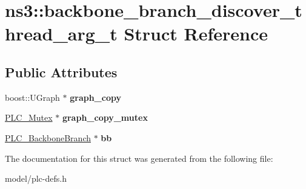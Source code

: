 \hypertarget{structns3_1_1backbone__branch__discover__thread__arg__t}{\section{ns3\-:\-:backbone\-\_\-branch\-\_\-discover\-\_\-thread\-\_\-arg\-\_\-t \-Struct \-Reference}
\label{structns3_1_1backbone__branch__discover__thread__arg__t}
}
\subsection*{\-Public \-Attributes}
\begin{DoxyCompactItemize}
\item 
\hypertarget{structns3_1_1backbone__branch__discover__thread__arg__t_ab4317ea3e51c1e7036318b20b28b3e81}{boost\-::\-U\-Graph $\ast$ {\bfseries graph\-\_\-copy}}\label{structns3_1_1backbone__branch__discover__thread__arg__t_ab4317ea3e51c1e7036318b20b28b3e81}

\item 
\hypertarget{structns3_1_1backbone__branch__discover__thread__arg__t_aebda45110313b30a94deffe5b3654e5a}{\hyperlink{structns3_1_1PLC__Mutex}{\-P\-L\-C\-\_\-\-Mutex} $\ast$ {\bfseries graph\-\_\-copy\-\_\-mutex}}\label{structns3_1_1backbone__branch__discover__thread__arg__t_aebda45110313b30a94deffe5b3654e5a}

\item 
\hypertarget{structns3_1_1backbone__branch__discover__thread__arg__t_ad109c6cdc036fc71b2d7b1be22bfd141}{\hyperlink{classns3_1_1PLC__BackboneBranch}{\-P\-L\-C\-\_\-\-Backbone\-Branch} $\ast$ {\bfseries bb}}\label{structns3_1_1backbone__branch__discover__thread__arg__t_ad109c6cdc036fc71b2d7b1be22bfd141}

\end{DoxyCompactItemize}


\-The documentation for this struct was generated from the following file\-:\begin{DoxyCompactItemize}
\item 
model/plc-\/defs.\-h\end{DoxyCompactItemize}
